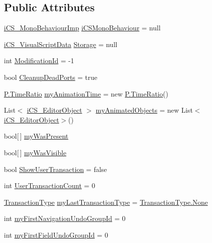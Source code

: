 \subsection*{Public Attributes}
\begin{DoxyCompactItemize}
\item 
\hyperlink{classi_c_s___mono_behaviour_imp}{i\+C\+S\+\_\+\+Mono\+Behaviour\+Imp} \hyperlink{classi_c_s___i_storage_a547c9b2e76ba81efd78408f62f793553}{i\+C\+S\+Mono\+Behaviour} = null
\item 
\hyperlink{classi_c_s___visual_script_data}{i\+C\+S\+\_\+\+Visual\+Script\+Data} \hyperlink{classi_c_s___i_storage_a5ac94101a8d712672043f618c201f38b}{Storage} = null
\item 
int \hyperlink{classi_c_s___i_storage_a0d048a5de0183c183b636c0bb5c8dddf}{Modification\+Id} = -\/1
\item 
bool \hyperlink{classi_c_s___i_storage_ac74bb4063cf7ed1b315cf3eea513f7c4}{Cleanup\+Dead\+Ports} = true
\item 
\hyperlink{class_prelude_1_1_time_ratio}{P.\+Time\+Ratio} \hyperlink{classi_c_s___i_storage_a0c36a19bc9bbd91e7ed2d65c93546428}{my\+Animation\+Time} = new \hyperlink{class_prelude_1_1_time_ratio}{P.\+Time\+Ratio}()
\item 
List$<$ \hyperlink{classi_c_s___editor_object}{i\+C\+S\+\_\+\+Editor\+Object} $>$ \hyperlink{classi_c_s___i_storage_a1e7f74c1d51883bfc451ac154a7e468c}{my\+Animated\+Objects} = new List$<$\hyperlink{classi_c_s___editor_object}{i\+C\+S\+\_\+\+Editor\+Object}$>$()
\item 
bool\mbox{[}$\,$\mbox{]} \hyperlink{classi_c_s___i_storage_ac59109ff4abd2826cc3dff8f7f2dc3e7}{my\+Was\+Present}
\item 
bool\mbox{[}$\,$\mbox{]} \hyperlink{classi_c_s___i_storage_a7d5f27f4e96fa702fe7f78865be2854e}{my\+Was\+Visible}
\item 
bool \hyperlink{classi_c_s___i_storage_aa67184e812e84967bfc2793d09b34eb5}{Show\+User\+Transaction} = false
\item 
int \hyperlink{classi_c_s___i_storage_a32542c2e4bb1f0c40135a537b503a2d2}{User\+Transaction\+Count} = 0
\item 
\hyperlink{i_c_s___i_storage___storage_mgmt_8cs_aa7a2e64697569804f14626bbb2649a58}{Transaction\+Type} \hyperlink{classi_c_s___i_storage_a3b225a376044a9c9f94bd2e96cbec862}{my\+Last\+Transaction\+Type} = \hyperlink{i_c_s___edge_enum_8cs_af0c43d9550817659c245d5d49fbb4771a6adf97f83acf6453d4a6a4b1070f3754}{Transaction\+Type.\+None}
\item 
int \hyperlink{classi_c_s___i_storage_ae7540a290e62b50c91145b37749bb339}{my\+First\+Navigation\+Undo\+Group\+Id} = 0
\item 
int \hyperlink{classi_c_s___i_storage_a152ea7b9651d04eb74d03508ccd0e4ec}{my\+First\+Field\+Undo\+Group\+Id} = 0
\end{DoxyCompactItemize}
